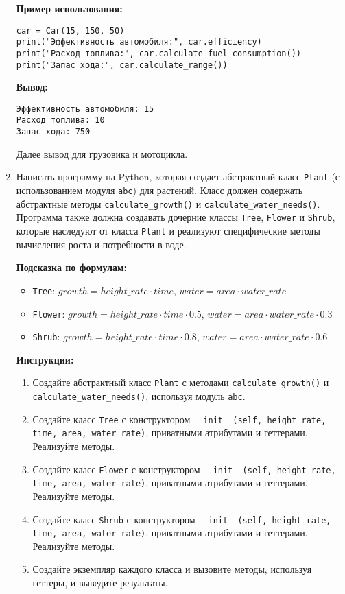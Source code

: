 \begin{enumerate}
\textbf{Пример использования:}
\begin{verbatim}
car = Car(15, 150, 50)
print("Эффективность автомобиля:", car.efficiency)
print("Расход топлива:", car.calculate_fuel_consumption())
print("Запас хода:", car.calculate_range())
\end{verbatim}

\textbf{Вывод:}
\begin{verbatim}
Эффективность автомобиля: 15
Расход топлива: 10
Запас хода: 750
\end{verbatim}

Далее вывод для грузовика и мотоцикла.

\item
Написать программу на Python, которая создает абстрактный класс \texttt{Plant} (с использованием модуля \texttt{abc}) для растений. 
Класс должен содержать абстрактные методы \texttt{calculate\_growth()} и \texttt{calculate\_water\_needs()}. 
Программа также должна создавать дочерние классы \texttt{Tree}, \texttt{Flower} и \texttt{Shrub}, 
которые наследуют от класса \texttt{Plant} и реализуют специфические методы вычисления роста и потребности в воде.

\textbf{Подсказка по формулам:}
\begin{itemize}
    \item \texttt{Tree}: $growth = height\_rate \cdot time$, $water = area \cdot water\_rate$
    \item \texttt{Flower}: $growth = height\_rate \cdot time \cdot 0.5$, $water = area \cdot water\_rate \cdot 0.3$
    \item \texttt{Shrub}: $growth = height\_rate \cdot time \cdot 0.8$, $water = area \cdot water\_rate \cdot 0.6$
\end{itemize}

\textbf{Инструкции:}
\begin{enumerate}
    \item Создайте абстрактный класс \texttt{Plant} с методами \texttt{calculate\_growth()} и \texttt{calculate\_water\_needs()}, используя модуль \texttt{abc}.
    \item Создайте класс \texttt{Tree} с конструктором \texttt{\_\_init\_\_(self, height\_rate, time, area, water\_rate)}, приватными атрибутами и геттерами. Реализуйте методы.
    \item Создайте класс \texttt{Flower} с конструктором \texttt{\_\_init\_\_(self, height\_rate, time, area, water\_rate)}, приватными атрибутами и геттерами. Реализуйте методы.
    \item Создайте класс \texttt{Shrub} с конструктором \texttt{\_\_init\_\_(self, height\_rate, time, area, water\_rate)}, приватными атрибутами и геттерами. Реализуйте методы.
    \item Создайте экземпляр каждого класса и вызовите методы, используя геттеры, и выведите результаты.
\end{enumerate}


\end{enumerate}

